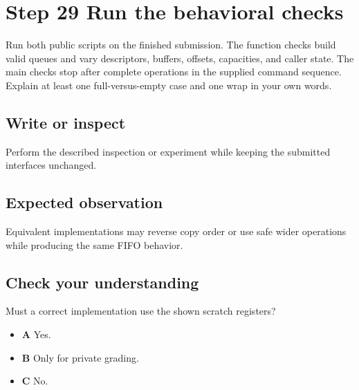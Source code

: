 \section{Step 29 Run the behavioral checks}\label{ring-s29}

Run both public scripts on the finished submission. The function checks build valid queues and vary descriptors, buffers, offsets, capacities, and caller state. The main checks stop after complete operations in the supplied command sequence. Explain at least one full-versus-empty case and one wrap in your own words.

\subsection{Write or inspect}
Perform the described inspection or experiment while keeping the submitted interfaces unchanged.

\subsection{Expected observation}
Equivalent implementations may reverse copy order or use safe wider operations while producing the same FIFO behavior.

\subsection{Check your understanding}
Must a correct implementation use the shown scratch registers?

\begin{itemize}
  \item \textbf{A} Yes.
  \item \textbf{B} Only for private grading.
  \item \textbf{C} No.
\end{itemize}

